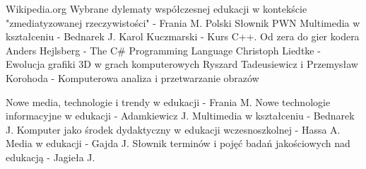 \documentclass{article}
\begin{document}
\newpage %
\renewcommand\refname{\section*{Bibliografia}}
\begin{thebibliography}{30}\linespread{1}\normalsize{
		Wikipedia.org
		Wybrane dylematy współczesnej edukacji w kontekście "zmediatyzowanej rzeczywistości" - Frania M.
		Polski Słownik PWN
		Multimedia w kształceniu - Bednarek J.
		Karol Kuczmarski - Kurs C++. Od zera do gier kodera
		Anders Hejlsberg - The C\# Programming Language
		Christoph Liedtke - Ewolucja grafiki 3D w grach komputerowych
		Ryszard Tadeusiewicz i Przemysław Korohoda - Komputerowa analiza i przetwarzanie obrazów
		
		Nowe media, technologie i trendy w edukacji - Frania M.
		Nowe technologie informacyjne w edukacji - Adamkiewicz J.
		Multimedia w kształceniu - Bednarek J.
		Komputer jako środek dydaktyczny w edukacji wczesnoszkolnej - Hassa A.
		Media w edukacji - Gajda J.
		Słownik terminów i pojęć badań jakościowych nad edukacją - Jagieła J.
	}
\end{thebibliography}
\end{document}
